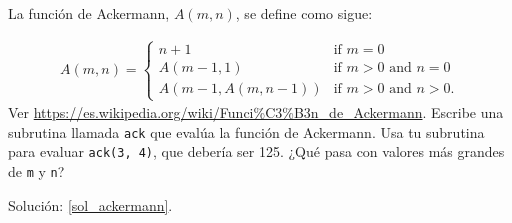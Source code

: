 \begin{exercise}
\label{ackermann}

La función de Ackermann, $A(m, n)$, se define como sigue:

\begin{eqnarray*}
A(m, n) = \begin{cases} 
              n+1 & \mbox{if } m = 0 \\ 
        A(m-1, 1) & \mbox{if } m > 0 \mbox{ and } n = 0 \\ 
A(m-1, A(m, n-1)) & \mbox{if } m > 0 \mbox{ and } n > 0.
\end{cases} 
\end{eqnarray*}
%
Ver \url{https://es.wikipedia.org/wiki/Funci%C3%B3n_de_Ackermann}.
Escribe una subrutina llamada {\tt ack} que evalúa la función de Ackermann.
Usa tu subrutina para evaluar {\tt ack(3, 4)}, que debería ser 125. 
¿Qué pasa con valores más grandes de {\tt m} y {\tt n}?

Solución: \ref{sol_ackermann}.

\end{exercise}


